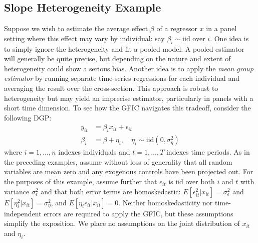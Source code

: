 \subsection{Slope Heterogeneity Example}
\label{sec:slopeHet}
Suppose we wish to estimate the average effect $\beta$ of a regressor $x$ in a panel setting where this effect may vary by individual: say $\beta_i \sim \mbox{iid}$ over $i$.
One idea is to simply ignore the heterogeneity and fit a pooled model.
A pooled estimator will generally be quite precise, but depending on the nature and extent of heterogeneity could show a serious bias.
Another idea is to apply the \emph{mean group estimator} by running separate time-series regressions for each individual and averaging the result over the cross-section.
This approach is robust to heterogeneity but may yield an imprecise estimator, particularly in panels with a short time dimension.
To see how the GFIC navigates this tradeoff, consider the following DGP:
	\begin{align}
				y_{it} &= \beta_i x_{it} + \epsilon_{it}\\
        \beta_i &= \beta + \eta_i, \quad \eta_i \sim \mbox{iid} (0, \sigma_\eta^2)
	\end{align}
where $i = 1, \hdots, n$ indexes individuals and $t=1, \hdots, T$ indexes time periods.
As in the preceding examples, assume without loss of generality that all random variables are mean zero and any exogenous controls have been projected out.
For the purposes of this example, assume further that $\epsilon_{it}$ is iid over both $i$ and $t$ with variance $\sigma_\epsilon^2$ and that both error terms are homoskedastic: $E[\epsilon_{it}^2 | x_{it}] = \sigma_\epsilon^2$ and $E[\eta_i^2 | x_{it}] = \sigma_\eta^2$, and $E[\eta_i \epsilon_{it} | x_{it}] = 0$.
Neither homoskedasticity nor time-independent errors are required to apply the GFIC, but these assumptions simplify the exposition.  
We place no assumptions on the joint distribution of $x_{it}$ and $\eta_i$.

